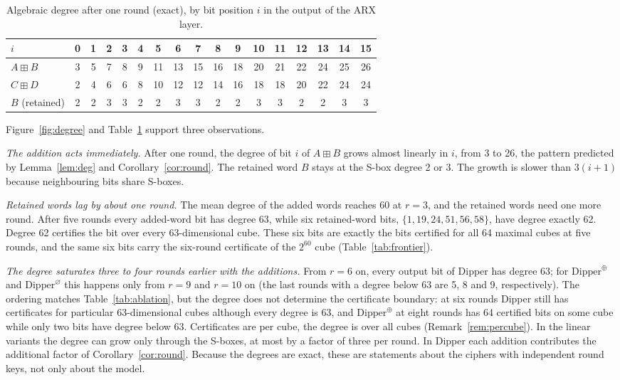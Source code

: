 \documentclass[pdflatex,sn-mathphys-num]{sn-jnl}
\theoremstyle{thmstyleone}
\theoremstyle{thmstylethree}
\theoremstyle{thmstyletwo}
\newcommand{\modadd}{\boxplus}
\begin{document}
\begin{table}[t]\centering
\caption{Algebraic degree after one round (exact), by bit position $i$ in the output of the ARX layer.}\label{tab:deg1}
\setlength{\tabcolsep}{3pt}
\begin{tabular}{l*{16}{c}}
\toprule
$i$ & 0&1&2&3&4&5&6&7&8&9&10&11&12&13&14&15\\
\midrule
$A\modadd B$ & 3&5&7&8&9&11&13&15&16&18&20&21&22&24&25&26\\
$C\modadd D$ & 2&4&6&6&8&10&12&12&14&16&18&18&20&22&24&24\\
$B$ (retained) & 2&2&3&3&2&2&3&3&2&2&3&3&2&2&3&3\\
\bottomrule
\end{tabular}
\end{table}

Figure~\ref{fig:degree} and Table~\ref{tab:deg1} support three observations.

\emph{The addition acts immediately.} After one round, the degree of bit $i$ of $A\modadd B$ grows almost linearly in $i$, from 3 to 26, the pattern predicted by Lemma~\ref{lem:deg} and Corollary~\ref{cor:round}. The retained word $B$ stays at the S-box degree 2 or 3. The growth is slower than $3(i+1)$ because neighbouring bits share S-boxes.

\emph{Retained words lag by about one round.} The mean degree of the added words reaches 60 at $r=3$, and the retained words need one more round. After five rounds every added-word bit has degree 63, while six retained-word bits, $\{1,19,24,51,56,58\}$, have degree exactly 62. Degree 62 certifies the bit over every 63-dimensional cube. These six bits are exactly the bits certified for all 64 maximal cubes at five rounds, and the same six bits carry the six-round certificate of the $2^{60}$ cube (Table~\ref{tab:frontier}).

\emph{The degree saturates three to four rounds earlier with the additions.} From $r=6$ on, every output bit of Dipper has degree 63; for $\mathrm{Dipper}^{\oplus}$ and $\mathrm{Dipper}^{\varnothing}$ this happens only from $r=9$ and $r=10$ on (the last rounds with a degree below 63 are 5, 8 and 9, respectively). The ordering matches Table~\ref{tab:ablation}, but the degree does not determine the certificate boundary: at six rounds Dipper still has certificates for particular 63-dimensional cubes although every degree is 63, and $\mathrm{Dipper}^{\oplus}$ at eight rounds has 64 certified bits on some cube while only two bits have degree below 63. Certificates are per cube, the degree is over all cubes (Remark~\ref{rem:percube}). In the linear variants the degree can grow only through the S-boxes, at most by a factor of three per round. In Dipper each addition contributes the additional factor of Corollary~\ref{cor:round}. Because the degrees are exact, these are statements about the ciphers with independent round keys, not only about the model.
\end{document}
